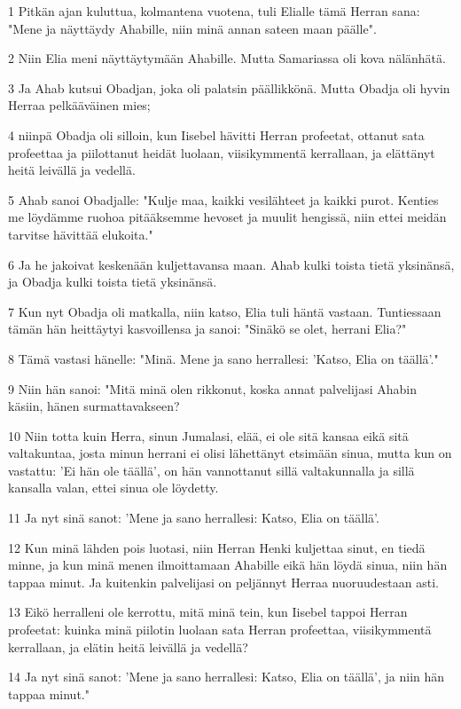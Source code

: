 \par 1 Pitkän ajan kuluttua, kolmantena vuotena, tuli Elialle tämä Herran sana: "Mene ja näyttäydy Ahabille, niin minä annan sateen maan päälle".
\par 2 Niin Elia meni näyttäytymään Ahabille. Mutta Samariassa oli kova nälänhätä.
\par 3 Ja Ahab kutsui Obadjan, joka oli palatsin päällikkönä. Mutta Obadja oli hyvin Herraa pelkääväinen mies;
\par 4 niinpä Obadja oli silloin, kun Iisebel hävitti Herran profeetat, ottanut sata profeettaa ja piilottanut heidät luolaan, viisikymmentä kerrallaan, ja elättänyt heitä leivällä ja vedellä.
\par 5 Ahab sanoi Obadjalle: "Kulje maa, kaikki vesilähteet ja kaikki purot. Kenties me löydämme ruohoa pitääksemme hevoset ja muulit hengissä, niin ettei meidän tarvitse hävittää elukoita."
\par 6 Ja he jakoivat keskenään kuljettavansa maan. Ahab kulki toista tietä yksinänsä, ja Obadja kulki toista tietä yksinänsä.
\par 7 Kun nyt Obadja oli matkalla, niin katso, Elia tuli häntä vastaan. Tuntiessaan tämän hän heittäytyi kasvoillensa ja sanoi: "Sinäkö se olet, herrani Elia?"
\par 8 Tämä vastasi hänelle: "Minä. Mene ja sano herrallesi: 'Katso, Elia on täällä'."
\par 9 Niin hän sanoi: "Mitä minä olen rikkonut, koska annat palvelijasi Ahabin käsiin, hänen surmattavakseen?
\par 10 Niin totta kuin Herra, sinun Jumalasi, elää, ei ole sitä kansaa eikä sitä valtakuntaa, josta minun herrani ei olisi lähettänyt etsimään sinua, mutta kun on vastattu: 'Ei hän ole täällä', on hän vannottanut sillä valtakunnalla ja sillä kansalla valan, ettei sinua ole löydetty.
\par 11 Ja nyt sinä sanot: 'Mene ja sano herrallesi: Katso, Elia on täällä'.
\par 12 Kun minä lähden pois luotasi, niin Herran Henki kuljettaa sinut, en tiedä minne, ja kun minä menen ilmoittamaan Ahabille eikä hän löydä sinua, niin hän tappaa minut. Ja kuitenkin palvelijasi on peljännyt Herraa nuoruudestaan asti.
\par 13 Eikö herralleni ole kerrottu, mitä minä tein, kun Iisebel tappoi Herran profeetat: kuinka minä piilotin luolaan sata Herran profeettaa, viisikymmentä kerrallaan, ja elätin heitä leivällä ja vedellä?
\par 14 Ja nyt sinä sanot: 'Mene ja sano herrallesi: Katso, Elia on täällä', ja niin hän tappaa minut."
